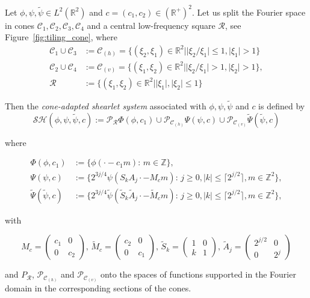 \bigskip

\begin{defn}
\label{def:cone_shearlets}
Let $\phi,\psi,\tilde{\psi}\in L^2(\mathbb{R}^2)$ and $c=(c_1,c_2)\in (\mathbb{R}^+)^2$. Let us split the Fourier space in cones $\mathcal{C}_1, \mathcal{C}_2, \mathcal{C}_3,\mathcal{C}_4$ and a central low-frequency square $\mathcal{R}$, see Figure~\ref{fig:tiling_cone}, where 
$$
\begin{aligned}
\mathcal{C}_1\cup \mathcal{C}_3 &:=\mathcal{C}_{(h)} =\{ (\xi_2,\xi_1)\in\mathbb{R}^2| |\xi_2/\xi_1|\leq 1,|\xi_1|>1\}\\
\mathcal{C}_2\cup \mathcal{C}_4 &:= \mathcal{C}_{(v)} =\{ (\xi_1,\xi_2)\in\mathbb{R}^2||\xi_2/\xi_1|> 1, |\xi_2|>1\},\\
\mathcal{R}&:=\{ (\xi_1,\xi_2)\in\mathbb{R}^2||\xi_1|,|\xi_2|\leq 1\}
\end{aligned}
$$
 

Then the \textit{cone-adapted shearlet system} associated with $\phi,\psi,\tilde{\psi}$ and $c$ is defined by 
$$
\mathcal{SH}(\phi,\psi,\tilde{\psi},c):=\mathcal{P}_{\mathcal{R}}\Phi(\phi,c_1)\cup \mathcal{P}_{\mathcal{C}_{(h)}}\Psi(\psi,c)\cup\mathcal{P}_{\mathcal{C}_{(v)}}\tilde{\Psi}(\tilde{\psi},c)
$$

where

$$
\begin{aligned}
\Phi(\phi,c_1)&:=\{\phi(\cdot-c_1m)\text{: }m\in\mathbb{Z}\},\\
\Psi(\psi,c)&:=\{2^{3j/4}\psi(S_kA_j\cdot-M_cm)\text{: } j\geq 0,|k|\leq\lceil 2^{j/2}\rceil,m\in\mathbb{Z}^2\},\\
\tilde{\Psi}(\tilde{\psi},c)&:=\{2^{3j/4}\tilde{\psi}(\tilde{S}_k\tilde{A}_j\cdot-\tilde{M}_cm)\text{: } j \geq 0,|k|\leq\lceil 2^{j/2}\rceil,m\in\mathbb{Z}^2\},
\end{aligned}
$$

with 

$$
M_c=\left(\begin{matrix} c_1 & 0 \\ 0 & c_2\end{matrix}\right)\text{,  }
\tilde{M}_c=\left(\begin{matrix} c_2 & 0 \\ 0 & c_1\end{matrix}\right) \text{,  }
\tilde{S}_k=\left(\begin{matrix} 1 & 0 \\ k & 1 \end{matrix}\right)\text{,  }
\tilde{A}_j=\left(\begin{matrix} 2^{j/2} & 0 \\ 0 & 2^j\end{matrix}\right)
$$

and $P_{\mathcal{R}}$, $\mathcal{P}_{\mathcal{C}_{(h)}}$ and $\mathcal{P}_{\mathcal{C}_{(v)}}$ onto the spaces of functions supported in the Fourier domain in the corresponding sections of the cones.
\end{defn}

